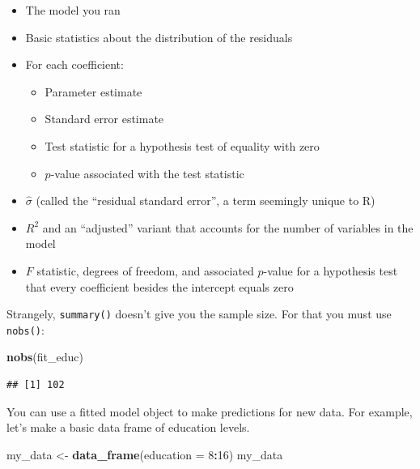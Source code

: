 \documentclass[12pt,oneside,openany]{book}
\newenvironment{Shaded}{\begin{snugshade}}{\end{snugshade}}
\newcommand{\KeywordTok}[1]{\textcolor[rgb]{0.13,0.29,0.53}{\textbf{#1}}}
\newcommand{\DataTypeTok}[1]{\textcolor[rgb]{0.13,0.29,0.53}{#1}}
\newcommand{\DecValTok}[1]{\textcolor[rgb]{0.00,0.00,0.81}{#1}}
\newcommand{\StringTok}[1]{\textcolor[rgb]{0.31,0.60,0.02}{#1}}
\newcommand{\OperatorTok}[1]{\textcolor[rgb]{0.81,0.36,0.00}{\textbf{#1}}}
\newcommand{\NormalTok}[1]{#1}
\providecommand{\tightlist}{%
  \setlength{\itemsep}{0pt}\setlength{\parskip}{0pt}}
\begin{document}
\begin{itemize}
\tightlist
\item
  The model you ran
\item
  Basic statistics about the distribution of the residuals
\item
  For each coefficient:

  \begin{itemize}
  \tightlist
  \item
    Parameter estimate
  \item
    Standard error estimate
  \item
    Test statistic for a hypothesis test of equality with zero
  \item
    \(p\)-value associated with the test statistic
  \end{itemize}
\item
  \(\hat{\sigma}\) (called the ``residual standard error'', a term
  seemingly unique to R)
\item
  \(R^2\) and an ``adjusted'' variant that accounts for the number of
  variables in the model
\item
  \(F\) statistic, degrees of freedom, and associated \(p\)-value for a
  hypothesis test that every coefficient besides the intercept equals
  zero
\end{itemize}

Strangely, \texttt{summary()} doesn't give you the sample size. For that
you must use \texttt{nobs()}:

\begin{Shaded}
\begin{Highlighting}[]
\KeywordTok{nobs}\NormalTok{(fit_educ)}
\end{Highlighting}
\end{Shaded}

\begin{verbatim}
## [1] 102
\end{verbatim}

You can use a fitted model object to make predictions for new data. For
example, let's make a basic data frame of education levels.

\begin{Shaded}
\begin{Highlighting}[]
\NormalTok{my_data <-}\StringTok{ }\KeywordTok{data_frame}\NormalTok{(}\DataTypeTok{education =} \DecValTok{8}\OperatorTok{:}\DecValTok{16}\NormalTok{)}
\NormalTok{my_data}
\end{Highlighting}
\end{Shaded}
\end{document}
